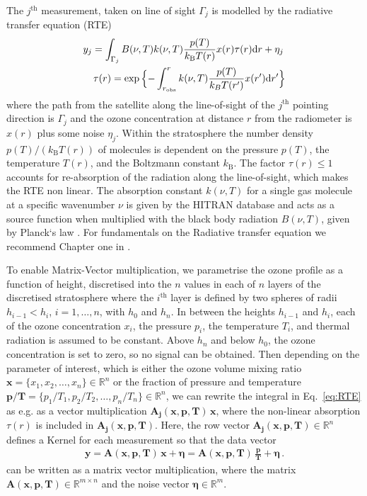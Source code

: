 The $j^\text{th}$ measurement, taken on line of sight $\Gamma_j$  is modelled by the radiative transfer equation (RTE)~\cite{mipas2000handbook}
\begin{align}
	\label{eq:RTE} 
	y_j =   \int_{\Gamma_j}  B(\nu,T) k(\nu, T)   \frac{p(T)}{k_{\text{B}} T(r)}  x(r)  \tau(r) \text{d}r + \eta_j \, \\
	\tau(r) = \exp{ \Bigl\{ - \int^{r}_{r_\text{obs}}  k(\nu, T)   \frac{p(T)}{k_B T(r^{\prime})}  x(r^{\prime}) \text{d}r^{\prime} \Bigr\} }
\end{align}
where the path from the satellite along the line-of-sight of the $j^\text{th}$ pointing direction is $\Gamma_j$ and the ozone concentration at distance $r$ from the radiometer is $x(r)$ plus some noise $\eta_j$.
Within the stratosphere the number density $p(T) / (k_{\text{B}} T(r))$ of molecules is dependent on the pressure $p(T)$, the temperature $T(r)$, and the Boltzmann constant $k_{\text{B}}$.
The factor $\tau(r)\leq 1$ accounts for re-absorption of the radiation along the line-of-sight, which makes the RTE non linear.
The absorption constant $k(\nu, T)$ for a single gas molecule at a specific wavenumber $\nu$ is given by the HITRAN database \cite{gordon2022hitran2020} and acts as a source function when multiplied with the black body radiation $B(\nu,T)$, given by Planck`s law \cite{rybicki2000rte}.
For fundamentals on the Radiative transfer equation we recommend Chapter one in \cite{rybicki2000rte}.

To enable Matrix-Vector multiplication, we parametrise the ozone profile as a function of height, discretised into the $n$ values in each of $n$ layers of the discretised stratosphere where the $i^\text{th}$ layer is defined by two spheres of radii  $h_{i-1} < h_{i}$, $i = 1, \dots, n$, with $h_0$ and $h_{n} $.
In between the heights $h_{i-1}$ and $h_{i}$, each of the ozone concentration $x_{i}$, the pressure $p_{i}$, the temperature $T_{i}$, and thermal radiation is assumed to be constant.
Above $h_{n}$ and below $h_0$, the ozone concentration is set to zero, so no signal can be obtained.
Then depending on the parameter of interest, which is either the ozone volume mixing ratio $\bm{x} =\{x_1,x_2,\ldots,x_n\} \in \mathbb{R}^{n}$ or the fraction of pressure and temperature $\bm{p/T}= \{p_1/T_1,p_2/T_2,\ldots,p_n/T_n\} \in \mathbb{R}^{n} $, we can rewrite the integral in Eq.~\eqref{eq:RTE} as e.g. as a vector multiplication $\bm{A_{j}}(\bm{x},  \bm{p},\bm{T}) \, \bm{x} $, where the non-linear absorption $\tau(r)$ is included in $\bm{A_{j}}(\bm{x},  \bm{p},\bm{T})$.
Here, the row vector $\bm{A_{j}}(\bm{x},  \bm{p},\bm{T}) \in \mathbb{R}^{n}$  defines a Kernel for each measurement so that the data vector
\begin{align}
	\bm{y} = \bm{A}(\bm{x},  \bm{p},\bm{T}) \, \bm{x} + \bm{\eta}= \bm{A}(\bm{x},  \bm{p},\bm{T}) \,
	\frac{ \bm{p}}{\bm{T}} + \bm{\eta} \, .
\end{align}
can be written as a matrix vector multiplication, where the matrix $\bm{A}(\bm{x},  \bm{p},\bm{T}) \in \mathbb{R}^{m \times n}$  and the noise vector $\bm{\eta} \in \mathbb{R}^{m}$.

